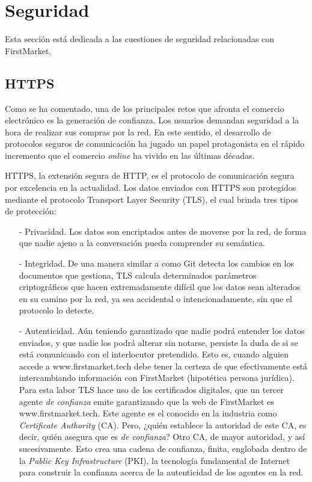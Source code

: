 \documentclass[a4paper]{article}
\begin{document}
	\section{Seguridad}
	Esta sección está dedicada a las cuestiones de seguridad relacionadas con FirstMarket.
	\subsection{HTTPS} \label{sec:https}
	Como se ha comentado, una de los principales retos que afronta el comercio electrónico es la generación de confianza. Los usuarios demandan seguridad a la hora de realizar sus compras por la red. En este sentido, el desarrollo de protocolos seguros de comunicación ha jugado un papel protagonista en el rápido incremento que el comercio \emph{online} ha vivido en las últimas décadas.
	
	HTTPS, la extensión segura de HTTP, es el protocolo de comunicación segura por excelencia en la actualidad. Los datos enviados con HTTPS son protegidos mediante el protocolo Transport Layer Security (TLS), el cual brinda tres tipos de protección:
	
		\begin{itemize}
			\item[-] Privacidad. Los datos son encriptados antes de moverse por la red, de forma que nadie ajeno a la conversación pueda comprender su semántica.
			\item[-] Integridad. De una manera similar a como Git detecta los cambios en los documentos que gestiona, TLS calcula determinados parámetros criptográficos que hacen extremadamente difícil que los datos sean alterados en su camino por la red, ya sea accidental o intencionadamente, sin que el protocolo lo detecte.
			\item[-] Autenticidad. Aún teniendo garantizado que nadie podrá entender los datos enviados, y que nadie los podrá alterar sin notarse, persiste la duda de si se está comunicando con el interlocutor pretendido. Esto es, cuando alguien accede a www.firstmarket.tech debe tener la certeza de que efectivamente está intercambiando información con FirstMarket (hipotética persona jurídica). Para esta labor TLS hace uso de los certificados digitales, que un tercer agente \emph{de confianza} emite garantizando que la web de FirstMarket es www.firstmarket.tech. Este agente es el conocido en la industria como \emph{Certificate Authority} (CA). Pero, ¿quién establece la autoridad de este CA, es decir, quién asegura que es \emph{de confianza}? Otro CA, de mayor autoridad, y así sucesivamente. Esto crea una cadena de confianza, finita, englobada dentro de la \emph{Public Key Infrastructure} (PKI), la tecnología fundamental de Internet para construir la confianza acerca de la autenticidad de los agentes en la red.
		\end{itemize}
	
\end{document}
